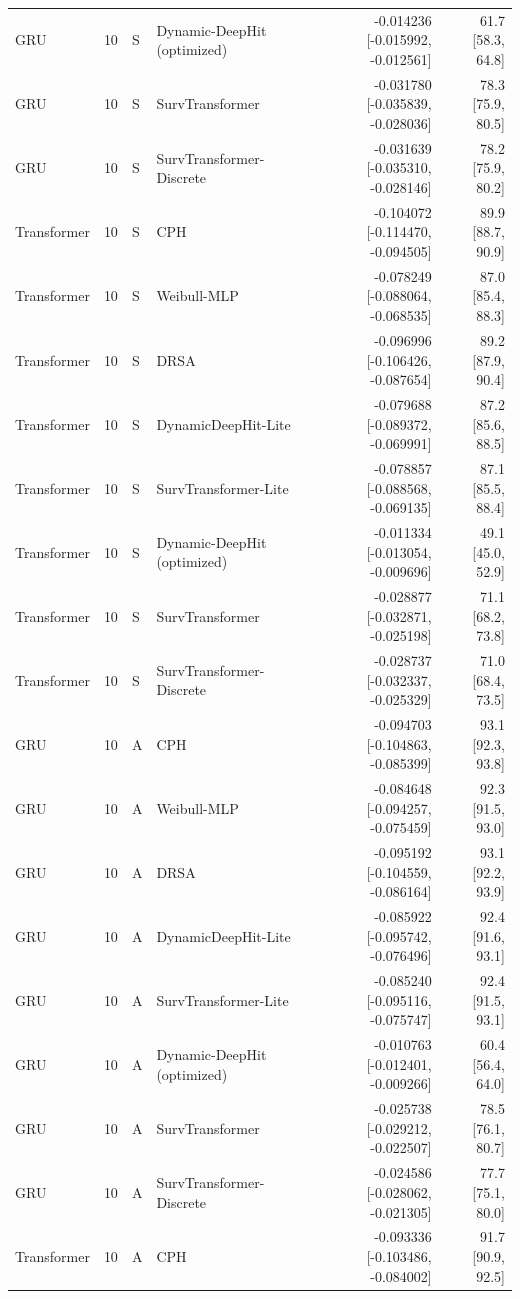 \begin{longtable}{lll p{3.0cm} rr}
GRU & 10 & S & Dynamic-DeepHit (optimized) & -0.014236 [-0.015992, -0.012561] & 61.7 [58.3, 64.8]\\
GRU & 10 & S & SurvTransformer & -0.031780 [-0.035839, -0.028036] & 78.3 [75.9, 80.5]\\
GRU & 10 & S & SurvTransformer-Discrete & -0.031639 [-0.035310, -0.028146] & 78.2 [75.9, 80.2]\\
Transformer & 10 & S & CPH & -0.104072 [-0.114470, -0.094505] & 89.9 [88.7, 90.9]\\
Transformer & 10 & S & Weibull-MLP & -0.078249 [-0.088064, -0.068535] & 87.0 [85.4, 88.3]\\
Transformer & 10 & S & DRSA & -0.096996 [-0.106426, -0.087654] & 89.2 [87.9, 90.4]\\
Transformer & 10 & S & DynamicDeepHit-Lite & -0.079688 [-0.089372, -0.069991] & 87.2 [85.6, 88.5]\\
Transformer & 10 & S & SurvTransformer-Lite & -0.078857 [-0.088568, -0.069135] & 87.1 [85.5, 88.4]\\
Transformer & 10 & S & Dynamic-DeepHit (optimized) & -0.011334 [-0.013054, -0.009696] & 49.1 [45.0, 52.9]\\
Transformer & 10 & S & SurvTransformer & -0.028877 [-0.032871, -0.025198] & 71.1 [68.2, 73.8]\\
Transformer & 10 & S & SurvTransformer-Discrete & -0.028737 [-0.032337, -0.025329] & 71.0 [68.4, 73.5]\\
GRU & 10 & A & CPH & -0.094703 [-0.104863, -0.085399] & 93.1 [92.3, 93.8]\\
GRU & 10 & A & Weibull-MLP & -0.084648 [-0.094257, -0.075459] & 92.3 [91.5, 93.0]\\
GRU & 10 & A & DRSA & -0.095192 [-0.104559, -0.086164] & 93.1 [92.2, 93.9]\\
GRU & 10 & A & DynamicDeepHit-Lite & -0.085922 [-0.095742, -0.076496] & 92.4 [91.6, 93.1]\\
GRU & 10 & A & SurvTransformer-Lite & -0.085240 [-0.095116, -0.075747] & 92.4 [91.5, 93.1]\\
GRU & 10 & A & Dynamic-DeepHit (optimized) & -0.010763 [-0.012401, -0.009266] & 60.4 [56.4, 64.0]\\
GRU & 10 & A & SurvTransformer & -0.025738 [-0.029212, -0.022507] & 78.5 [76.1, 80.7]\\
GRU & 10 & A & SurvTransformer-Discrete & -0.024586 [-0.028062, -0.021305] & 77.7 [75.1, 80.0]\\
Transformer & 10 & A & CPH & -0.093336 [-0.103486, -0.084002] & 91.7 [90.9, 92.5]\\

\end{longtable}

